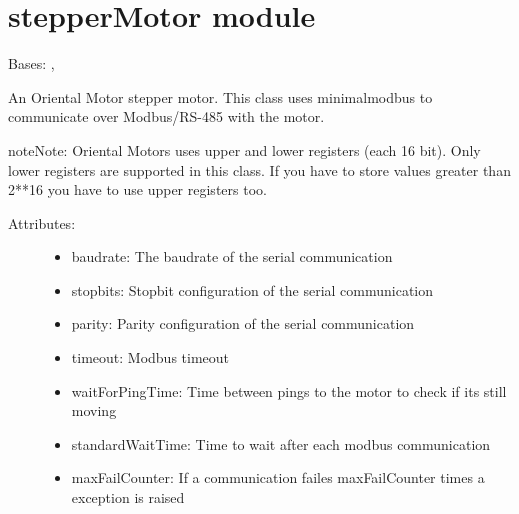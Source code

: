 \documentclass[letterpaper,10pt,english]{sphinxmanual}
\begin{document}
\section{stepperMotor module}
\label{stepperMotor:steppermotor-module}\label{stepperMotor::doc}\label{stepperMotor:module-stepperMotor}

\begin{fulllineitems}
\label{stepperMotor:stepperMotor.StepperMotor}
Bases: {\hyperref[minimalmodbus:minimalmodbus.Instrument]{}}, 

An Oriental Motor stepper motor. This class uses minimalmodbus to
communicate over Modbus/RS-485 with the motor.

\begin{notice}{note}{Note:}
Oriental Motors uses upper and lower registers (each 16 bit). Only lower registers are
supported in this class. If you have to store values greater than 2**16 you have to use
upper registers too.
\end{notice}
\begin{description}
\item[{Attributes:}] \leavevmode\begin{itemize}
\item {} 
baudrate: The baudrate of the serial communication

\item {} 
stopbits: Stopbit configuration of the serial communication

\item {} 
parity: Parity configuration of the serial communication

\item {} 
timeout: Modbus timeout

\item {} 
waitForPingTime: Time between pings to the motor to check if its still moving

\item {} 
standardWaitTime: Time to wait after each modbus communication

\item {} 
maxFailCounter: If a communication failes maxFailCounter times a exception is raised


\end{itemize}
\end{description}
\end{fulllineitems}
\end{document}
